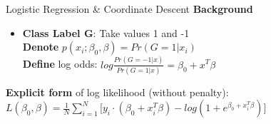\documentclass{beamer}
\begin{document}
\begin{frame}{Logistic Regression \& Coordinate Descent}
\textbf{Background}
\vspace*{3mm}

    \begin{itemize}
        \item \textbf{Class Label G}: Take values 1 and -1 \\
         \vspace*{1mm}
          \textbf{Denote} \(p(x_{i};\beta_0,\beta) = Pr(G=1\lvert x_{i})\) \\
          \vspace*{1mm}
     \textbf{Define} log odds: \(log\frac{Pr(G=-1 \lvert x)}{Pr(G=1 \lvert x)} = \beta_0 +x^T \beta\) \\

    \end{itemize}
 {
\textbf{Explicit form} of log likelihood (without penalty): \(L(\beta_0,\beta)=\frac{1}{N}\sum_{i=1}^{N}\big[ y_i \cdot(\beta_0 +x_i^T \beta) -log(1+e^{\beta_0 +x_i^T \beta})\big]\)
}
 
\end{frame}
\end{document}
